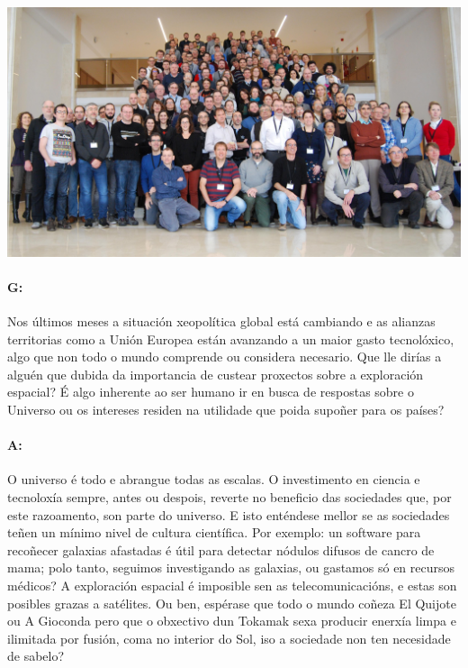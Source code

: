 \begin{refsection}
\begin{multicols}{2}
\begin{center}
    \includegraphics[width=1\linewidth]{revistas/002/imaxes/grupogaia.jpg}
\end{center}

\paragraph{G:} Nos últimos meses a situación xeopolítica global está cambiando e
as alianzas territorias como a Unión Europea están avanzando a un maior gasto
tecnolóxico, algo que non todo o mundo comprende ou considera necesario. Que
lle dirías a alguén que dubida da importancia de custear proxectos sobre a
exploración espacial? É algo inherente ao ser humano ir en busca de respostas
sobre o Universo ou os intereses residen na utilidade que poida supoñer para os
países?

\paragraph{A:} O universo é todo e abrangue todas as escalas. O investimento en
ciencia e tecnoloxía sempre, antes ou despois, reverte no beneficio das
sociedades que, por este razoamento, son parte do universo. E isto enténdese
mellor se as sociedades teñen un mínimo nivel de cultura científica. Por
exemplo: un software para recoñecer galaxias afastadas é útil para detectar
nódulos difusos de cancro de mama; polo tanto, seguimos investigando as
galaxias, ou gastamos só en recursos médicos? A exploración espacial é
imposible sen as telecomunicacións, e estas son posibles grazas a satélites. Ou
ben, espérase que todo o mundo coñeza El Quijote ou A Gioconda pero que o
obxectivo dun Tokamak sexa producir enerxía limpa e ilimitada por fusión, coma
no interior do Sol, iso a sociedade non ten necesidade de sabelo?


\end{multicols}
\end{refsection}
